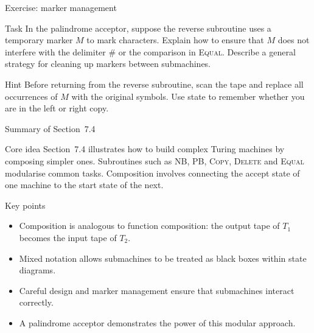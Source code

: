 \begin{frame}[t]{Exercise: marker management}
  \begin{tblock}{Task}
    In the palindrome acceptor, suppose the reverse subroutine uses a
    temporary marker $M$ to mark characters.  Explain how to ensure
    that $M$ does not interfere with the delimiter $\#$ or the
    comparison in \textsc{Equal}.  Describe a general strategy for
    cleaning up markers between submachines.
  \end{tblock}
  \begin{talert}{Hint}
    Before returning from the reverse subroutine, scan the tape and
    replace all occurrences of $M$ with the original symbols.  Use
    state to remember whether you are in the left or right copy.
  \end{talert}
  \label{fr:7.4-12}
\end{frame}

\begin{frame}[t]{Summary of Section 7.4}
  \begin{tblock}{Core idea}
    Section 7.4 illustrates how to build complex Turing machines by
    composing simpler ones.  Subroutines such as \textsc{NB},
    \textsc{PB}, \textsc{Copy}, \textsc{Delete} and \textsc{Equal}
    modularise common tasks.  Composition involves connecting the
    accept state of one machine to the start state of the next.
  \end{tblock}
  \begin{tblock}{Key points}
    \begin{itemize}
      \item Composition is analogous to function composition: the
        output tape of $T_1$ becomes the input tape of $T_2$.
      \item Mixed notation allows submachines to be treated as black
        boxes within state diagrams.
      \item Careful design and marker management ensure that
        submachines interact correctly.
      \item A palindrome acceptor demonstrates the power of this
        modular approach.
    \end{itemize}
  \end{tblock}
  \label{fr:7.4-13}
\end{frame}

